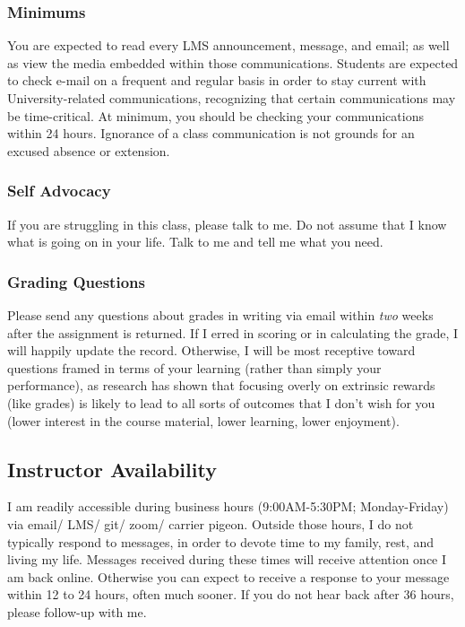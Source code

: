 \documentclass[11pt,]{article}
\begin{document}
\hypertarget{minimums}{%
\subsubsection{Minimums}\label{minimums}}

You are expected to read every LMS announcement, message, and email; as
well as view the media embedded within those communications. Students
are expected to check e-mail on a frequent and regular basis in order to
stay current with University-related communications, recognizing that
certain communications may be time-critical. At minimum, you should be
checking your communications within 24 hours. Ignorance of a class
communication is not grounds for an excused absence or extension.

\hypertarget{self-advocacy}{%
\subsubsection{Self Advocacy}\label{self-advocacy}}

If you are struggling in this class, please talk to me. Do not assume
that I know what is going on in your life. Talk to me and tell me what
you need.

\hypertarget{grading-questions}{%
\subsubsection{Grading Questions}\label{grading-questions}}

Please send any questions about grades in writing via email within
\emph{two} weeks after the assignment is returned. If I erred in scoring
or in calculating the grade, I will happily update the record.
Otherwise, I will be most receptive toward questions framed in terms of
your learning (rather than simply your performance), as research has
shown that focusing overly on extrinsic rewards (like grades) is likely
to lead to all sorts of outcomes that I don't wish for you (lower
interest in the course material, lower learning, lower enjoyment).

\hypertarget{instructor-availability}{%
\subsection{Instructor Availability}\label{instructor-availability}}

I am readily accessible during business hours (9:00AM-5:30PM;
Monday-Friday) via email/ LMS/ git/ zoom/ carrier pigeon. Outside those
hours, I do not typically respond to messages, in order to devote time
to my family, rest, and living my life. Messages received during these
times will receive attention once I am back online. Otherwise you can
expect to receive a response to your message within 12 to 24 hours,
often much sooner. If you do not hear back after 36 hours, please
follow-up with me.
\end{document}
